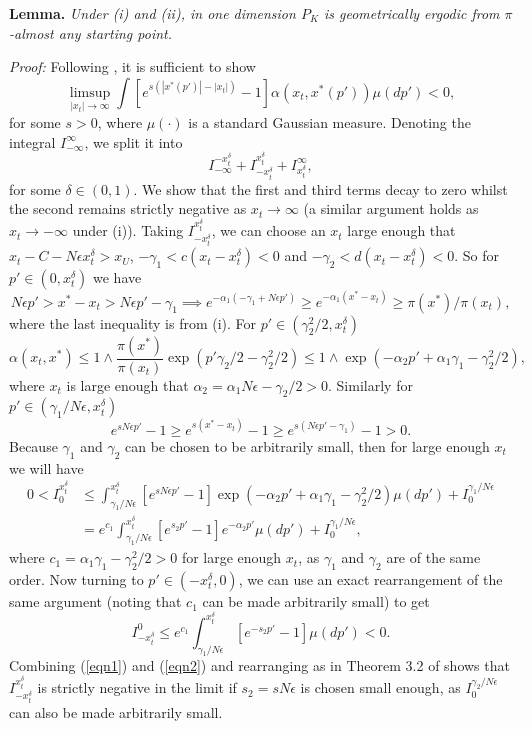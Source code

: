 \documentclass{article}
\begin{document}
\textbf{Lemma.} \emph{Under (i) and (ii), in one dimension $P_K$ is geometrically ergodic from $\pi$-almost any starting point.}

\emph{Proof:} Following \cite{meng1996, rob1996}, it is sufficient to show
\[
\limsup_{|x_t| \to \infty} \int \left[ e^{s(|x^*(p')| - |x_t|)} - 1 \right] \alpha(x_t,x^*(p'))\mu(dp') < 0,
\]
for some $s > 0$, where $\mu(\cdot)$ is a standard Gaussian measure.  Denoting the integral $I_{-\infty}^{\infty}$, we split it into
\[
I_{-\infty}^{-x_t^\delta} + I_{-x_t^\delta}^{x_t^\delta} + I_{x_t^\delta}^\infty,
\]
for some $\delta \in (0,1)$.  We show that the first and third terms decay to zero whilst the second remains strictly negative as $x_t \to \infty$ (a similar argument holds as $x_t \to -\infty$ under (i)).  Taking $I_{-x_t^\delta}^{x_t^\delta}$, we can choose an $x_t$ large enough that $x_t - C - N\epsilon x_t^\delta > x_U$, $-\gamma_1 < c(x_t-x_t^{\delta}) < 0$ and $-\gamma_2 < d(x_t - x_t^{\delta}) < 0$.  So for $p' \in (0,x_t^\delta)$ we have
\[
N\epsilon p' > x^* - x_t > N\epsilon p' - \gamma_1 \implies e^{-\alpha_1 (-\gamma_1 + N\epsilon p')} \geq e^{-\alpha_1 (x^* - x_t) } \geq \pi(x^*)/\pi(x_t),
\]
where the last inequality is from (i).  For $p' \in (\gamma_2^2/2,x_t^\delta)$
\[
\alpha(x_t,x^*)  \leq 1 \wedge \frac{\pi(x^*)}{\pi(x_t)} \exp \left( p'\gamma_2/2 - \gamma_2^2/2 \right) \leq 1 \wedge \exp \left( -\alpha_2 p' + \alpha_1\gamma_1 - \gamma_2^2/2 \right),
\]
where $x_t$ is large enough that $\alpha_2 = \alpha_1 N\epsilon - \gamma_2/2 > 0$. Similarly for $p' \in (\gamma_1/N\epsilon,x_t^\delta)$
\[ e^{sN\epsilon p'} - 1 \geq e^{s(x^* - x_t)} - 1 \geq e^{s(N\epsilon p' - \gamma_1)} - 1 > 0. \]
Because $\gamma_1$ and $\gamma_2$ can be chosen to be arbitrarily small, then for large enough $x_t$ we will have
\begin{align}
0 < I_0^{x_t^\delta} &\leq \int_{\gamma_1/N\epsilon}^{x_t^\delta}  [e^{sN\epsilon p'} - 1]\exp \left( -\alpha_2 p' + \alpha_1\gamma_1 - \gamma_2^2/2 \right) \mu(dp') + I_0^{\gamma_1/N\epsilon} \nonumber \\ \label{eqn1}
&= e^{c_1}\int_{\gamma_1/N\epsilon}^{x_t^\delta} [e^{s_2 p'} - 1]e^{-\alpha_2 p'} \mu(dp')  + I_0^{\gamma_1/N\epsilon},
\end{align}
where $c_1 = \alpha_1\gamma_1 - \gamma_2^2/2 > 0$ for large enough $x_t$, as $\gamma_1$ and $\gamma_2$ are of the same order.  Now turning to $p' \in (-x_t^\delta,0)$, we can use an exact rearrangement of the same argument (noting that $c_1$ can be made arbitrarily small) to get
\begin{equation}  \label{eqn2}
I_{-x_t^\delta}^0 \leq e^{c_1}\int_{\gamma_1/N\epsilon}^{x_t^\delta} [e^{-s_2 p'} - 1] \mu(dp') < 0.
\end{equation}
Combining (\ref{eqn1}) and (\ref{eqn2}) and rearranging as in Theorem 3.2 of \cite{meng1996} shows that $I_{-x_t^\delta}^{x_t^\delta}$ is strictly negative in the limit if $s_2 = sN\epsilon$ is chosen small enough, as $I_0^{\gamma_2/N\epsilon}$ can also be made arbitrarily small.
\end{document}

